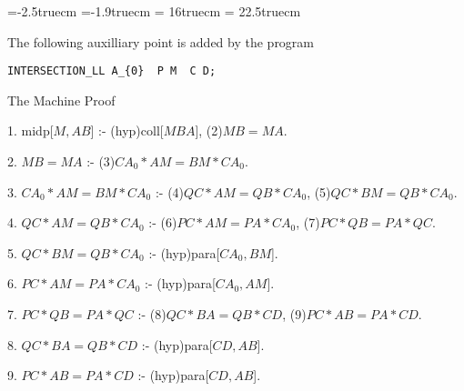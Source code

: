 \voffset=-2.5truecm
\hoffset=-1.9truecm
\textwidth = 16truecm
\textheight = 22.5truecm
\parskip=8pt
\parindent=15pt
\def\fa#1#2{\langle{#1},{#2}\rangle}

The following auxilliary point is added by the program

\begin{verbatim}
INTERSECTION_LL A_{0}  P M  C D;
\end{verbatim}


{\vskip6pt \parskip=6pt \parindent=10pt 
The Machine Proof


1. midp[$M,AB$] :- (hyp)coll[$MBA$], (2)$MB = MA$.

2. $MB = MA$ :- (3)$CA_{0}*AM = BM*CA_{0}$.

3. $CA_{0}*AM = BM*CA_{0}$ :- (4)$QC*AM = QB*CA_{0}$, (5)$QC*BM = QB*CA_{0}$.

4. $QC*AM = QB*CA_{0}$ :- (6)$PC*AM = PA*CA_{0}$, (7)$PC*QB = PA*QC$.

5. $QC*BM = QB*CA_{0}$ :- (hyp)para[$CA_{0},BM$].

6. $PC*AM = PA*CA_{0}$ :- (hyp)para[$CA_{0},AM$].

7. $PC*QB = PA*QC$ :- (8)$QC*BA = QB*CD$, (9)$PC*AB = PA*CD$.

8. $QC*BA = QB*CD$ :- (hyp)para[$CD,AB$].

9. $PC*AB = PA*CD$ :- (hyp)para[$CD,AB$].
}

